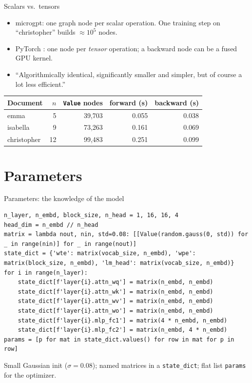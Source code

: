 \documentclass[aspectratio=169,11pt]{beamer}
\begin{document}
\begin{frame}{Scalars vs.\ tensors}
\begin{itemize}
  \item microgpt: one graph node per scalar operation. One training step on ``christopher'' builds $\approx 10^5$ nodes.
  \item PyTorch \parencite{paszke2017autodiff,paszke2019pytorch}: one node per \emph{tensor} operation; a backward node can be a fused GPU kernel.
  \item ``Algorithmically identical, significantly smaller and simpler, but of course a lot less efficient.''
\end{itemize}
\vfill
\centering
\begin{tabular}{@{}lrrrr@{}}
\toprule
Document & $n$ & \texttt{Value} nodes & forward (s) & backward (s)\\
\midrule
emma & 5 & 39{,}703 & 0.055 & 0.038 \\
isabella & 9 & 73{,}263 & 0.161 & 0.069 \\
christopher & 12 & 99{,}483 & 0.251 & 0.099 \\
\bottomrule
\end{tabular}
\end{frame}

\section{Parameters}
\begin{frame}[fragile]{Parameters: the knowledge of the model}
\begin{lstlisting}
n_layer, n_embd, block_size, n_head = 1, 16, 16, 4
head_dim = n_embd // n_head
matrix = lambda nout, nin, std=0.08: [[Value(random.gauss(0, std)) for _ in range(nin)] for _ in range(nout)]
state_dict = {'wte': matrix(vocab_size, n_embd), 'wpe': matrix(block_size, n_embd), 'lm_head': matrix(vocab_size, n_embd)}
for i in range(n_layer):
    state_dict[f'layer{i}.attn_wq'] = matrix(n_embd, n_embd)
    state_dict[f'layer{i}.attn_wk'] = matrix(n_embd, n_embd)
    state_dict[f'layer{i}.attn_wv'] = matrix(n_embd, n_embd)
    state_dict[f'layer{i}.attn_wo'] = matrix(n_embd, n_embd)
    state_dict[f'layer{i}.mlp_fc1'] = matrix(4 * n_embd, n_embd)
    state_dict[f'layer{i}.mlp_fc2'] = matrix(n_embd, 4 * n_embd)
params = [p for mat in state_dict.values() for row in mat for p in row]
\end{lstlisting}
Small Gaussian init ($\sigma = 0.08$); named matrices in a \texttt{state\_dict}; flat list \texttt{params} for the optimizer.
\end{frame}
\end{document}
